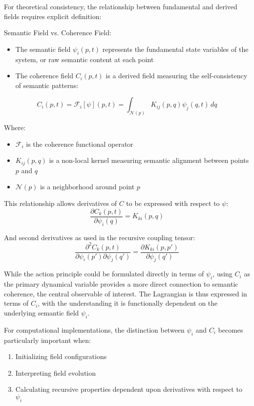 For theoretical consistency, the relationship between fundamental and derived fields requires explicit definition:

Semantic Field vs. Coherence Field:
\begin{itemize}
    \item The semantic field \(\psi_i(p,t)\) represents the fundamental state variables of the system, or raw semantic content at each point
    \item The coherence field \(C_i(p,t)\) is a derived field measuring the self-consistency of semantic patterns:
\end{itemize}
\begin{equation}
C_i(p,t) = \mathcal{F}_i[\psi](p,t) = \int_{\mathcal{N}(p)} K_{ij}(p,q) \psi_j(q,t) \, dq
\end{equation}

Where:
\begin{itemize}
    \item \(\mathcal{F}_i\) is the coherence functional operator
    \item \(K_{ij}(p,q)\) is a non-local kernel measuring semantic alignment between points \(p\) and \(q\)
    \item \(\mathcal{N}(p)\) is a neighborhood around point \(p\)
\end{itemize}

This relationship allows derivatives of \(C\) to be expressed with respect to \(\psi\):
\begin{equation}
\frac{\partial C_k(p,t)}{\partial \psi_i(q)} = K_{ki}(p,q)
\end{equation}

And second derivatives as used in the recursive coupling tensor:
\begin{equation}
\frac{\partial^2 C_k(p,t)}{\partial \psi_i(p') \partial \psi_j(q')} = \frac{\partial K_{ki}(p,p')}{\partial \psi_j(q')}
\end{equation}

While the action principle could be formulated directly in terms of \(\psi_i\), using \(C_i\) as the primary dynamical variable provides a more direct connection to semantic coherence, the central observable of interest. The Lagrangian is thus expressed in terms of \(C_i\), with the understanding it is functionally dependent on the underlying semantic field \(\psi_i\).

For computational implementations, the distinction between \(\psi_i\) and \(C_i\) becomes particularly important when:
\begin{enumerate}
    \item Initializing field configurations
    \item Interpreting field evolution
    \item Calculating recursive properties dependent upon derivatives with respect to \(\psi_i\)
\end{enumerate}


